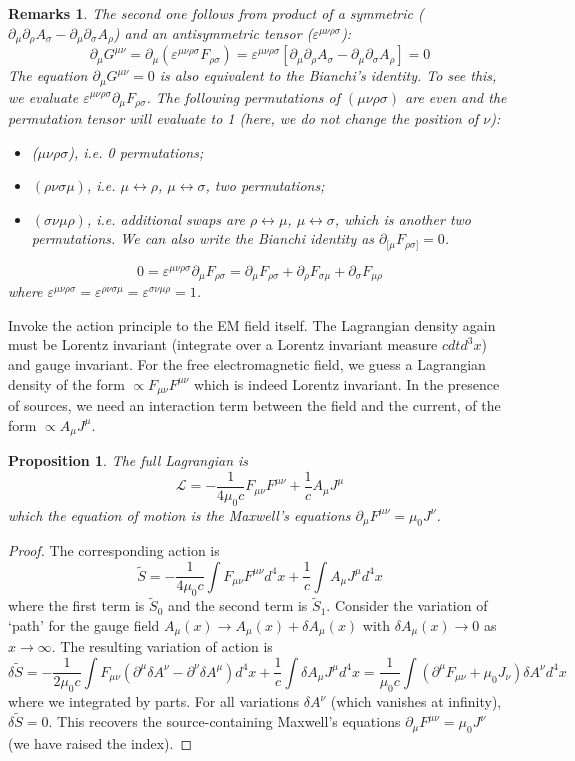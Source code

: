 \documentclass[a4paper]{article}
\newtheorem{remarks}{Remarks}[section]
\theoremstyle{new}
\newtheorem{prop}{Proposition}[section]
\begin{document}
\begin{remarks}
The second one follows from product of a symmetric ($\partial_\mu\partial_\rho A_\sigma-\partial_\mu\partial_\sigma A_\rho$) and an antisymmetric tensor ($\varepsilon^{\mu\nu\rho\sigma}$):
$$\partial_\mu G^{\mu\nu}=\partial_\mu(\varepsilon^{\mu\nu\rho\sigma}F_{\rho\sigma})=\varepsilon^{\mu\nu\rho\sigma}[\partial_\mu\partial_\rho A_\sigma-\partial_\mu\partial_\sigma A_\rho]=0$$
The equation $\partial_\mu G^{\mu\nu}=0$ is also equivalent to the Bianchi's identity. To see this, we evaluate $\varepsilon^{\mu\nu\rho\sigma}\partial_\mu F_{\rho\sigma}$. The following permutations of $(\mu\nu\rho\sigma)$ are even and the permutation tensor will evaluate to 1 (here, we do not change the position of $\nu$):
\begin{itemize}
\item ($\mu\nu\rho\sigma$), i.e. 0 permutations;
\item $(\rho\nu\sigma\mu)$, i.e. $\mu\leftrightarrow\rho$, $\mu\leftrightarrow\sigma$, two permutations; 
\item $(\sigma\nu\mu\rho)$, i.e. additional swaps are $\rho\leftrightarrow\mu$, $\mu\leftrightarrow\sigma$, which is another two permutations. We can also write the Bianchi identity as $\partial_{[\mu}F_{\rho\sigma]}=0$.
\end{itemize}
$$0=\varepsilon^{\mu\nu\rho\sigma}\partial_\mu F_{\rho\sigma}=\partial_\mu F_{\rho\sigma}+\partial_\rho F_{\sigma\mu}+\partial_\sigma F_{\mu\rho}$$
where $\varepsilon^{\mu\nu\rho\sigma}=\varepsilon^{\rho\nu\sigma\mu}=\varepsilon^{\sigma\nu\mu\rho}=1$.
\end{remarks}
\newpage
Invoke the action principle to the EM field itself. The Lagrangian density again must be Lorentz invariant (integrate over a Lorentz invariant measure $cdt d^3x$) and gauge invariant. For the free electromagnetic field, we guess a Lagrangian density of the form $\propto F_{\mu\nu}F^{\mu\nu}$ which is indeed Lorentz invariant. In the presence of sources, we need an interaction term between the field and the current, of the form $\propto A_\mu J^\mu$. 
\begin{prop}
The full Lagrangian is
$$\mathcal{L}=-\frac{1}{4\mu_0c}F_{\mu\nu}F^{\mu\nu}+\frac{1}{c}A_\mu J^\mu$$
which the equation of motion is the Maxwell's equations $\partial_\mu F^{\mu\nu}=\mu_0J^\nu$.
\end{prop}
\begin{proof}
The corresponding action is
$$\tilde{S}=-\frac{1}{4\mu_0c}\int F_{\mu\nu}F^{\mu\nu}d^4x+\frac{1}{c}\int A_\mu J^\mu d^4x$$
where the first term is $\tilde{S}_0$ and the second term is $\tilde{S}_1$. Consider the variation of `path' for the gauge field $A_\mu(x)\rightarrow A_\mu(x)+\delta A_\mu(x)$ with $\delta A_\mu(x)\rightarrow0$ as $x\rightarrow\infty$. The resulting variation of action is
$$\delta\tilde{S}=-\frac{1}{2\mu_0c}\int F_{\mu\nu}(\partial^\mu\delta A^\nu-\partial^\nu\delta A^\mu)d^4x+\frac{1}{c}\int\delta A_\mu J^\mu d^4x=\frac{1}{\mu_0c}\int(\partial^\mu F_{\mu\nu}+\mu_0J_\nu)\delta A^\nu d^4x$$
where we integrated by parts. For all variations $\delta A^\nu$ (which vanishes at infinity), $\delta\tilde{S}=0$. This recovers the source-containing Maxwell's equations $\partial_\mu F^{\mu\nu}=\mu_0J^\nu$ (we have raised the index).
\end{proof}
\end{document}
